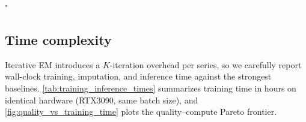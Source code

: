 "\documentclass{article}
\theoremstyle{plain}
\theoremstyle{definition}
\theoremstyle{remark}
\begin{document}
\vspace{-1mm}
\subsection{Time complexity}
\label{sec:time-complexity}
\vspace{-1mm}

Iterative EM introduces a $K$-iteration overhead per series, so we carefully report wall-clock training, imputation, and inference time against the strongest baselines. \cref{tab:training_inference_times} summarizes training time in hours on identical hardware (RTX3090, same batch size), and \cref{fig:quality_vs_training_time} plots the quality--compute Pareto frontier.

\begin{table}[h]
\centering
\small
\setlength{\tabcolsep}{3pt}
\caption{\textbf{Wall-clock training time (hours) to best disc.\ score}, on identical hardware (RTX3090), across three sequence lengths and three missing rates. Our method is up to $8$--$10\times$ faster than KoVAE at length $24$ because warm-starting the M-step from the previous EM iteration's weights amortises training cost across iterations; ImagenI2R trains a single pass so is our primary compute-matched comparison. \texttt{TODO} cells await scheduled runs; baseline KoVAE numbers are from~\citet{fadlon2025imageni2r}.}
\label{tab:training_inference_times}
\end{table}
\end{document}
